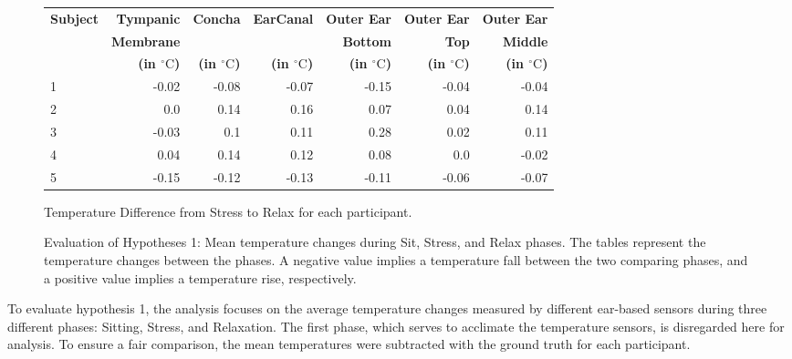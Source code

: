 \begin{figure}[t]
    \begin{subtable}{\textwidth}
        \centering
        \begin{tabular}{|l|rrrrrr|}
        \hline
        \textbf{Subject} & \textbf{Tympanic} & \textbf{Concha} & \textbf{EarCanal} & \textbf{Outer Ear} & \textbf{Outer Ear} & \textbf{Outer Ear} \\
             & \textbf{Membrane} &  &  & \textbf{Bottom} & \textbf{Top} & \textbf{Middle} \\   
             &\textbf{(in \(^\circ\text{C}\))} & \textbf{(in \(^\circ\text{C}\))} & \textbf{(in \(^\circ\text{C}\))} & \textbf{(in \(^\circ\text{C}\))} & \textbf{(in \(^\circ\text{C}\))} & \textbf{(in \(^\circ\text{C}\))} \\
        \hline
        1 & -0.02 & -0.08 & -0.07 & -0.15 & -0.04 & -0.04 \\
        2 & 0.0 & 0.14 & 0.16 & 0.07 & 0.04 & 0.14 \\
        3 & -0.03 & 0.1 & 0.11 & 0.28 & 0.02 & 0.11 \\
        4 & 0.04 & 0.14 & 0.12 & 0.08 & 0.0 & -0.02 \\
        5 & -0.15 & -0.12 & -0.13 & -0.11 & -0.06 & -0.07 \\
        \hline
        \end{tabular}
        \caption{Temperature Difference from Stress to Relax for each participant.}
        \label{subsec:Evaluation:Study2:Hypothesis1:temp_diff_stress_to_relax_all}
    \end{subtable} 
    \caption{Evaluation of Hypotheses 1: Mean temperature changes during Sit, Stress, and Relax phases. The tables represent the temperature changes between the phases. A negative value implies a temperature fall between the two comparing phases, and a positive value implies a temperature rise, respectively.}
    \label{sec:Evaluation:Study2:Hypothesis1:Summary}
\end{figure}

To evaluate hypothesis 1, the analysis focuses on the average temperature changes measured by different ear-based sensors during three different phases: Sitting, Stress, and Relaxation. 
The first phase, which serves to acclimate the temperature sensors, is disregarded here for analysis.
To ensure a fair comparison, the mean temperatures were subtracted with the ground truth for each participant.

